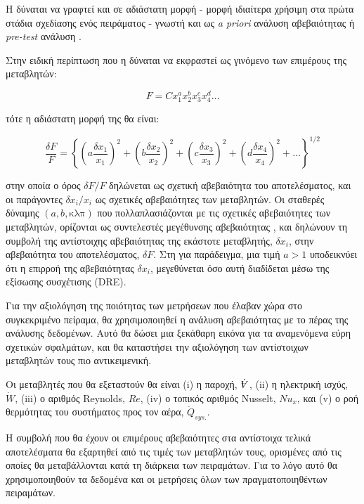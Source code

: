 \noindent H  δύναται να γραφτεί και σε αδιάστατη μορφή - μορφή ιδιαίτερα χρήσιμη στα πρώτα στάδια σχεδίασης ενός πειράματος - γνωστή και ως \textit{a priori} ανάλυση αβεβαιότητας \cite{1985_Moffat} ή \textit{pre-test} ανάλυση \cite{1973_Abernathy_TECH_REPORT}.

Στην ειδική περίπτωση που η  δύναται να εκφραστεί ως γινόμενο των επιμέρους της μεταβλητών:

\begin{equation}\label{eq:prod}
F = C x_1^a x_2^b x_3^c x_4^d \dots
\end{equation}

\noindent τότε η αδιάστατη μορφή της θα είναι:

\begin{equation}\label{relrss}
\frac{\delta F}{F} = \left\{\left(a \frac{\delta x_1}{x_1} \right)^2 + \left(b \frac{\delta x_2}{x_2} \right)^2 + \left(c \frac{\delta x_3}{x_3} \right)^2 + \left(d \frac{\delta x_4}{x_4} \right)^2 + \dots \right\}^{1/2}
\end{equation}

\noindent στην οποία ο όρος $\delta F / F$ δηλώνεται ως σχετική αβεβαιότητα του αποτελέσματος, και οι παράγοντες $\delta x_i / x_i$ ως σχετικές αβεβαιότητες των μεταβλητών. Οι σταθερές δύναμης $(a,b, \text{κλπ})$ που πολλαπλασιάζονται με τις σχετικές αβεβαιότητες των μεταβλητών, ορίζονται ως συντελεστές μεγέθυνσης αβεβαιότητας \cite{2018_HughW.Coleman_BOOK}, και δηλώνουν τη συμβολή της αντίστοιχης αβεβαιότητας της εκάστοτε μεταβλητής, $\delta x_i$, στην αβεβαιότητα του αποτελέσματος, $\delta F$. Στη  για παράδειγμα, μια τιμή $a > 1$ υποδεικνύει ότι η επιρροή της αβεβαιότητας $\delta x_i$, μεγεθύνεται όσο αυτή διαδίδεται μέσω της εξίσωσης συσχέτισης (DRE).

Για την αξιολόγηση της ποιότητας των μετρήσεων που έλαβαν χώρα στο συγκεκριμένο πείραμα, θα χρησιμοποιηθεί η ανάλυση αβεβαιότητας με το πέρας της ανάλυσης δεδομένων. Αυτό θα δώσει μια ξεκάθαρη εικόνα για τα αναμενόμενα εύρη σχετικών σφαλμάτων, και θα καταστήσει την αξιολόγηση των αντίστοιχων μεταβλητών τους πιο αντικειμενική.

Οι μεταβλητές που θα εξεταστούν θα είναι (i) η παροχή, $\dot{\volume}$, (ii) η ηλεκτρική ισχύς, $\dot{W}$, (iii) ο αριθμός Reynolds, $Re$, (iv) ο τοπικός αριθμός Nusselt, $Nu_x$, και (v) ο ροή θερμότητας του συστήματος προς τον αέρα, $\dot{Q}_{sys.}$.

Η συμβολή που θα έχουν οι επιμέρους αβεβαιότητες στα αντίστοιχα τελικά αποτελέσματα θα εξαρτηθεί από τις τιμές των μεταβλητών τους, ορισμένες από τις οποίες θα μεταβάλλονται κατά τη διάρκεια των πειραμάτων. Για το λόγο αυτό θα χρησιμοποιηθούν τα δεδομένα και οι μετρήσεις όλων των πραγματοποιηθέντων πειραμάτων.
 
